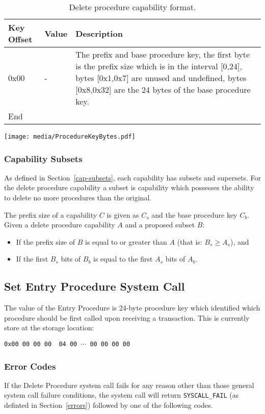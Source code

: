 \documentclass[english,a4paper]{article}
\let\oldparagraph\subsubsection
\renewcommand{\subsubsection}[1]{\oldparagraph{#1}\mbox{}}
\begin{document}
\begin{table}[H]
  \caption{Delete procedure capability format.}
  \centering{}%
  \begin{tabular}{l|l|p{}}
    \hline
    Key Offset & Value & Description\tabularnewline
    \hline
    \hline
    0x00 & -  & The prefix and base procedure key, the first byte is the prefix
                 size which is in the interval [0,24], bytes [0x1,0x7] are
                 unused and undefined, bytes [0x8,0x32] are the 24 bytes of the
                 base procedure key. \tabularnewline
    \hline
    End &  \tabularnewline
    \hline
  \end{tabular}
\end{table}

\texttt{[image: media/ProcedureKeyBytes.pdf]}

\subsubsection{Capability Subsets}
As defined in Section~\ref{cap-subsets}, each capability has subsets and
supersets. For the delete procedure capability a subset is capability which
possesses the ability to delete no more procedures than the original.

The prefix size of a capability $C$ is given as $C_s$ and the base procedure key
$C_b$. Given a delete procedure capability $A$ and a proposed subset $B$:
\begin{itemize}
  \item If the prefix size of $B$ is equal to or greater than $A$ (that is: $B_s
  \geq A_s$), and
  \item If the first $B_s$ bits of $B_b$ is equal to the first $A_s$ bits of
  $A_b$.
\end{itemize}

\subsection{Set Entry Procedure System Call}
The value of the Entry Procedure is 24-byte procedure key which identified which
procedure should be first called upon receiving a transaction. This is currently
store at the storage location:

\texttt{0x00 00 00 00 {\color{blue} 04} 00 $\cdots$ 00 00 00 00}

\subsubsection{Error Codes}
If the Delete Procedure system call fails for any reason other than those
general system call failure conditions, the system call will return
\texttt{SYSCALL\_FAIL} (as definted in Section~\ref{errors}) followed by one of
the following codes.
\end{document}
